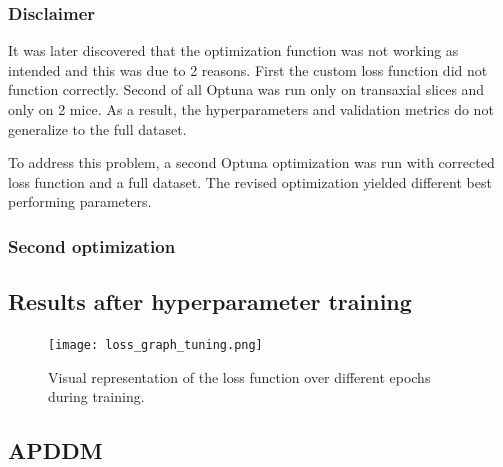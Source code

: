 \documentclass[twocolumn]{article}
\begin{document}
\subsubsection{Disclaimer}
It was later discovered that the optimization function was not working as intended and this was due to 2 reasons.
First the custom loss function did not function correctly. Second of all Optuna was run only on transaxial slices and only on 2 mice. 
As a result, the hyperparameters and validation metrics do not generalize to the full dataset. 

To address this problem, a second Optuna optimization was run with corrected loss function and a full dataset. 
The revised optimization yielded different best performing parameters. 

\subsubsection{Second optimization}


\subsection{Results after hyperparameter training}
\begin{figure}
    \centering
    \texttt{[image: loss\_graph\_tuning.png]}
    \caption{Visual representation of the loss function over different epochs during training.}
    \label{fig:train_loss}
\end{figure}

\begin{table}[h]
    \centering
    \caption{\label{tab:mouse_distribution} Mouse distribution across training, validation, and testing sets.}
\end{table}

    

\subsection{APDDM}
\end{document}
